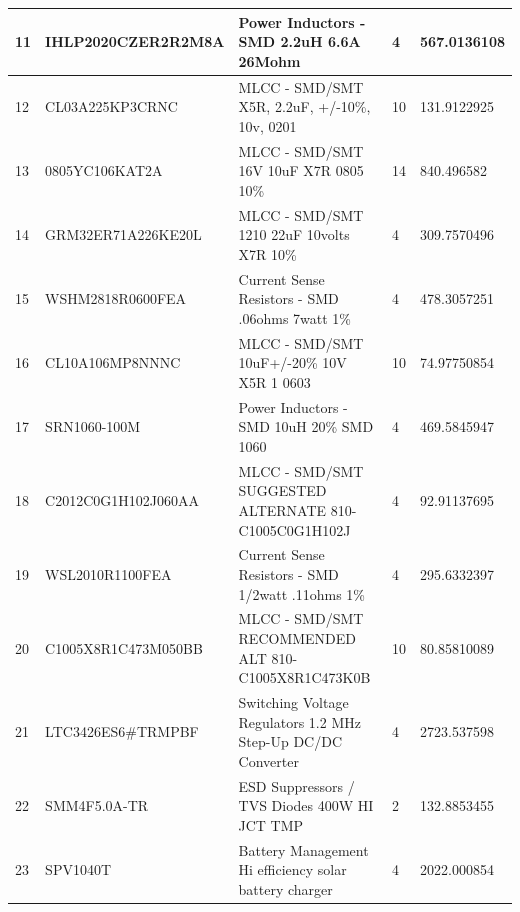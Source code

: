 \begin{table}[ht]
{\begin{tabular}{|llll|l|}
			\multicolumn{1}{|l|}{11} & \multicolumn{1}{l|}{IHLP2020CZER2R2M8A} & \multicolumn{1}{l|}{Power Inductors - SMD   2.2uH 6.6A 26Mohm} & 4 & 567.0136108 \\ \hline
			\multicolumn{1}{|l|}{12} & \multicolumn{1}{l|}{CL03A225KP3CRNC} & \multicolumn{1}{l|}{MLCC - SMD/SMT X5R,   2.2uF, +/-10\%, 10v, 0201} & 10 & 131.9122925 \\ \hline
			\multicolumn{1}{|l|}{13} & \multicolumn{1}{l|}{0805YC106KAT2A} & \multicolumn{1}{l|}{MLCC - SMD/SMT 16V   10uF X7R 0805 10\%} & 14 & 840.496582 \\ \hline
			\multicolumn{1}{|l|}{14} & \multicolumn{1}{l|}{GRM32ER71A226KE20L} & \multicolumn{1}{l|}{MLCC - SMD/SMT 1210   22uF 10volts X7R 10\%} & 4 & 309.7570496 \\ \hline
			\multicolumn{1}{|l|}{15} & \multicolumn{1}{l|}{WSHM2818R0600FEA} & \multicolumn{1}{l|}{Current Sense   Resistors - SMD .06ohms 7watt 1\%} & 4 & 478.3057251 \\ \hline
			\multicolumn{1}{|l|}{16} & \multicolumn{1}{l|}{CL10A106MP8NNNC} & \multicolumn{1}{l|}{MLCC - SMD/SMT   10uF+/-20\% 10V X5R 1 0603} & 10 & 74.97750854 \\ \hline
			\multicolumn{1}{|l|}{17} & \multicolumn{1}{l|}{SRN1060-100M} & \multicolumn{1}{l|}{Power Inductors - SMD   10uH 20\% SMD 1060} & 4 & 469.5845947 \\ \hline
			\multicolumn{1}{|l|}{18} & \multicolumn{1}{l|}{C2012C0G1H102J060AA} & \multicolumn{1}{l|}{MLCC - SMD/SMT   SUGGESTED ALTERNATE 810-C1005C0G1H102J} & 4 & 92.91137695 \\ \hline
			\multicolumn{1}{|l|}{19} & \multicolumn{1}{l|}{WSL2010R1100FEA} & \multicolumn{1}{l|}{Current Sense   Resistors - SMD 1/2watt .11ohms 1\%} & 4 & 295.6332397 \\ \hline
			\multicolumn{1}{|l|}{20} & \multicolumn{1}{l|}{C1005X8R1C473M050BB} & \multicolumn{1}{l|}{MLCC - SMD/SMT   RECOMMENDED ALT 810-C1005X8R1C473K0B} & 10 & 80.85810089 \\ \hline
			\multicolumn{1}{|l|}{21} & \multicolumn{1}{l|}{LTC3426ES6\#TRMPBF} & \multicolumn{1}{l|}{Switching Voltage   Regulators 1.2 MHz Step-Up DC/DC Converter} & 4 & 2723.537598 \\ \hline
			\multicolumn{1}{|l|}{22} & \multicolumn{1}{l|}{SMM4F5.0A-TR} & \multicolumn{1}{l|}{ESD Suppressors / TVS   Diodes 400W HI JCT TMP} & 2 & 132.8853455 \\ \hline
			\multicolumn{1}{|l|}{23} & \multicolumn{1}{l|}{SPV1040T} & \multicolumn{1}{l|}{Battery Management Hi   efficiency solar battery charger} & 4 & 2022.000854 \\ \hline

\end{tabular}}
\end{table}
